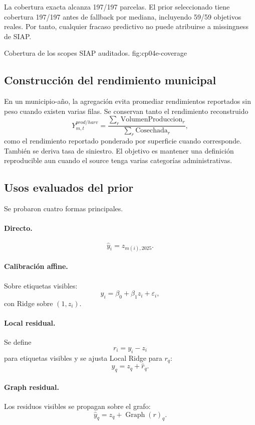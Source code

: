 La cobertura exacta alcanza 197/197 parcelas. El prior seleccionado tiene cobertura 197/197
antes de fallback por mediana, incluyendo 59/59 objetivos reales. Por tanto, cualquier fracaso
predictivo no puede atribuirse a missingness de SIAP.

{Cobertura de los scopes SIAP auditados.}
{fig:cp04e-coverage}

\subsection{Construcción del rendimiento municipal}

En un municipio-año, la agregación evita promediar rendimientos reportados sin peso cuando
existen varias filas. Se conservan tanto el rendimiento reconstruido
\[
Y^{prod/harv}_{m,t}
=
\frac{\sum_r \mathrm{VolumenProduccion}_{r}}
{\sum_r \mathrm{Cosechada}_{r}},
\]
como el rendimiento reportado ponderado por superficie cuando corresponde. También se deriva
tasa de siniestro. El objetivo es mantener una definición reproducible aun cuando el source
tenga varias categorías administrativas.

\subsection{Usos evaluados del prior}

Se probaron cuatro formas principales.

\paragraph{Directo.}
\[
\hat y_i=z_{m(i),2025}.
\]

\paragraph{Calibración affine.}
Sobre etiquetas visibles:
\[
y_i=\beta_0+\beta_1z_i+\varepsilon_i,
\]
con Ridge sobre $(1,z_i)$.

\paragraph{Local residual.}
Se define
\[
r_i=y_i-z_i
\]
para etiquetas visibles y se ajusta Local Ridge para $r_q$:
\[
\hat y_q=z_q+\hat r_q.
\]

\paragraph{Graph residual.}
Los residuos visibles se propagan sobre el grafo:
\[
\hat y_q=z_q+\operatorname{Graph}(r)_q.
\]

